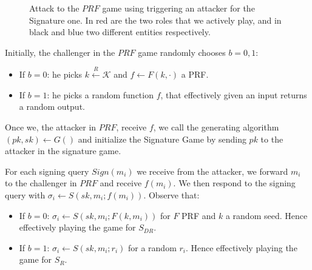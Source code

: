 \begin{figure}[h!]
    \caption{Attack to the $PRF$ game using triggering an attacker for the Signature one. In red are the two roles that we actively play, and in black and blue two different entities respectively.\label{fig:attack-game}}
\end{figure}

Initially, the challenger in the $PRF$ game randomly chooses $b = 0,1$:
\begin{itemize}
    \item If $b = 0$: he picks $k \overset{R}{\longleftarrow} \mathcal{K}$ and $f \leftarrow F(k, \cdot)$ a PRF.
    \item If $b = 1$: he picks a random function $f$, that effectively given an input returns a random output.
\end{itemize}
Once we, the attacker in $PRF$, receive $f$, we call the generating algorithm $(pk, sk) \leftarrow G()$ and initialize the Signature Game by sending $pk$ to the attacker in the signature game.

For each signing query $Sign(m_i)$ we receive from the attacker, we forward $m_i$ to the challenger in $PRF$ and receive $f(m_i)$.
We then respond to the signing query with $\sigma_i \leftarrow S(sk, m_i; f(m_i))$.
Observe that:
\begin{itemize}
    \item If $b = 0$: $\sigma_i \leftarrow S(sk, m_i; F(k, m_i))$ for $F$ PRF and $k$ a random seed. Hence effectively playing the game for $S_{DR}$.
    \item If $b = 1$: $\sigma_i \leftarrow S(sk, m_i; r_i)$ for a random $r_i$. Hence effectively playing the game for $S_R$.
\end{itemize}

